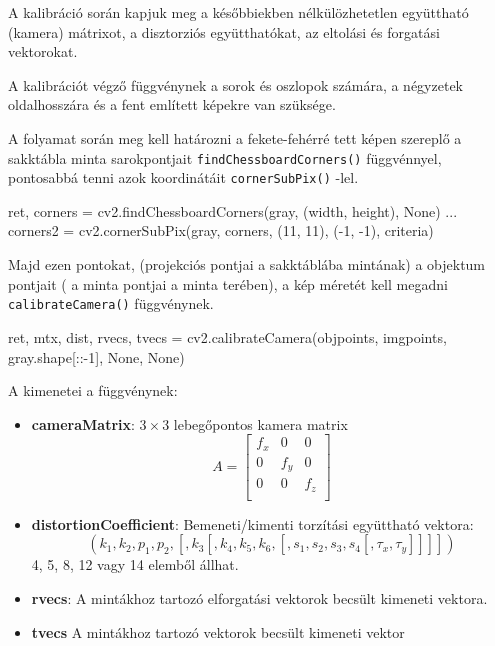 A kalibráció során kapjuk meg a későbbiekben nélkülözhetetlen együttható (kamera) mátrixot, a disztorziós együtthatókat, az eltolási és forgatási vektorokat.

A kalibrációt végző függvénynek a sorok és oszlopok számára, a négyzetek oldalhosszára és a fent említett képekre van szüksége.

A folyamat során meg kell határozni a fekete-fehérré tett képen szereplő a sakktábla minta sarokpontjait 
\texttt{findChessboardCorners()} függvénnyel, pontosabbá tenni azok koordinátáit 
\texttt{cornerSubPix()} -lel. 
\begin{python}
ret, corners = cv2.findChessboardCorners(gray, (width, height), None)
...
corners2 = cv2.cornerSubPix(gray, corners, (11, 11), (-1, -1), criteria)
\end{python} 

Majd ezen pontokat, (projekciós pontjai a sakktáblába mintának) a objektum pontjait ( a minta pontjai a minta terében), a kép méretét kell megadni \texttt{calibrateCamera()} függvénynek. \\

\begin{python}
  ret, mtx, dist, rvecs, tvecs = cv2.calibrateCamera(objpoints,
   imgpoints, gray.shape[::-1], None, None)
\end{python} 

A kimenetei a függvénynek:
\begin{itemize}
\item {\bf cameraMatrix}: $3 \times 3$ lebegőpontos kamera matrix
\[
A = 
\begin{bmatrix}
	f_x & 0 & 0 \\
	0 & f_y & 0 \\
	0 & 0 & f_z \\
\end{bmatrix}
\]

\item {\bf distortionCoefficient}: Bemeneti/kimenti torzítási együttható vektora:
\[
(k_1, k_2, p_1, p_2, [, k_3 [, k_4, k_5, k_6, [, s_1, s_2, s_3, s_4 [, \tau_x, \tau_y]]]])
\]
4, 5, 8, 12 vagy 14 elemből állhat.

\item {\bf rvecs}: A mintákhoz tartozó elforgatási vektorok becsült kimeneti vektora.

\item {\bf tvecs}  A mintákhoz tartozó vektorok becsült kimeneti vektor
\end{itemize}


